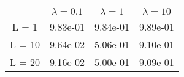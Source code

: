 \begin{tabular}{cccc}
& $\lambda = 0.1$ & $\lambda = 1$ & $\lambda = 10$ \\
\hline
L = 1 & 9.83e-01 & 9.84e-01 & 9.89e-01 \\
L = 10 & 9.64e-02 & 5.06e-01 & 9.10e-01 \\
L = 20 & 9.16e-02 & 5.00e-01 & 9.09e-01 \\
\hline
\end{tabular}
